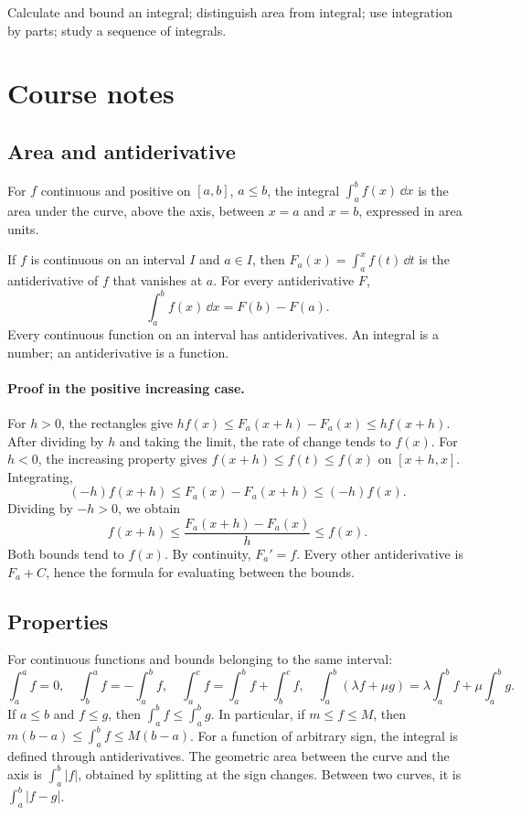 \label{ch:8}


\begin{keypoint}[Objectives]Calculate and bound an integral; distinguish area from integral; use integration by parts; study a sequence of integrals.\end{keypoint}

\section{Course notes}
\subsection{Area and antiderivative}
For $f$ continuous and positive on $[a,b]$, $a\le b$, the integral $\int_a^b f(x)\,\dd x$ is the area under the curve, above the axis, between $x=a$ and $x=b$, expressed in area units.
\begin{keypoint}
If $f$ is continuous on an interval $I$ and $a\in I$, then $F_a(x)=\int_a^x f(t)\,\dd t$ is the antiderivative of $f$ that vanishes at $a$. For every antiderivative $F$,
\[\int_a^b f(x)\,\dd x=F(b)-F(a).\]
Every continuous function on an interval has antiderivatives. An integral is a number; an antiderivative is a function.
\end{keypoint}
\paragraph{Proof in the positive increasing case.} For $h>0$, the rectangles give $hf(x)\le F_a(x+h)-F_a(x)\le hf(x+h)$. After dividing by $h$ and taking the limit, the rate of change tends to $f(x)$. For $h<0$, the increasing property gives $f(x+h)\le f(t)\le f(x)$ on $[x+h,x]$. Integrating,
\[(-h)f(x+h)\le F_a(x)-F_a(x+h)\le(-h)f(x).\]
Dividing by $-h>0$, we obtain
\[f(x+h)\le\frac{F_a(x+h)-F_a(x)}h\le f(x).\]
Both bounds tend to $f(x)$. By continuity, $F_a'=f$. Every other antiderivative is $F_a+C$, hence the formula for evaluating between the bounds.
\subsection{Properties}
For continuous functions and bounds belonging to the same interval:
\[\int_a^a f=0,\quad\int_b^a f=-\int_a^b f,\quad
\int_a^c f=\int_a^b f+\int_b^c f,\quad
\int_a^b(\lambda f+\mu g)=\lambda\int_a^b f+\mu\int_a^b g.\]
If $a\le b$ and $f\le g$, then $\int_a^b f\le\int_a^b g$. In particular, if $m\le f\le M$, then $m(b-a)\le\int_a^b f\le M(b-a)$.
For a function of arbitrary sign, the integral is defined through antiderivatives. The geometric area between the curve and the axis is $\int_a^b|f|$, obtained by splitting at the sign changes. Between two curves, it is $\int_a^b|f-g|$.
